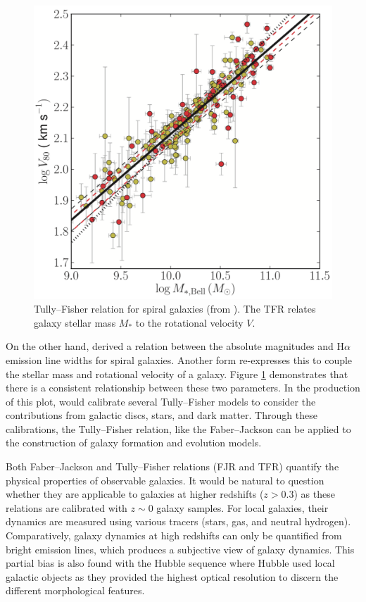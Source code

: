 \documentclass[12pt, twocolumn, nofootinbib]{revtex4-1}    %
\begin{document}
\begin{figure}
\includegraphics[width=\linewidth]{introduction/reyes_2011}
\caption{Tully--Fisher relation for spiral galaxies (from \citealt{2012ApJS..203...17R}). The TFR relates galaxy stellar mass $M_*$ to the rotational velocity $V$.}
\label{fig:tully_fisher}
\end{figure}

On the other hand, \cite{1977A&A....54..661T} derived a relation between the absolute magnitudes and H$\alpha$ emission line widths for spiral galaxies. Another form re-expresses this to couple the stellar mass and rotational velocity of a galaxy. Figure \ref{fig:tully_fisher} demonstrates that there is a consistent relationship between these two parameters. In the production of this plot, \cite{2011MNRAS.417.2347R} would calibrate several Tully--Fisher models to consider the contributions from galactic discs, stars, and dark matter. Through these calibrations, the Tully--Fisher relation, like the Faber--Jackson can be applied to the construction of galaxy formation and evolution models.

Both Faber--Jackson and Tully--Fisher relations (FJR and TFR) quantify the physical properties of observable galaxies. It would be natural to question whether they are applicable to galaxies at higher redshifts ($z>0.3$) as these relations are calibrated with $z\sim0$ galaxy samples. For local galaxies, their dynamics are measured using various tracers (stars, gas, and neutral hydrogen). Comparatively, galaxy dynamics at high redshifts can only be quantified from bright emission lines, which produces a subjective view of galaxy dynamics. This partial bias is also found with the Hubble sequence where Hubble used local galactic objects as they provided the highest optical resolution to discern the different morphological features. 
\end{document}
